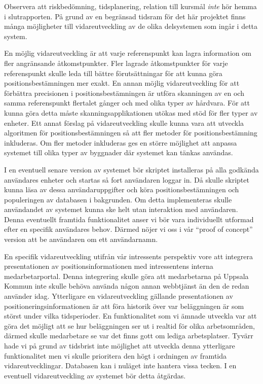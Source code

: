 \documentclass[a4paper,12pt]{article}
\begin{document}
Observera att risk\-be\-döm\-ning, tids\-planering, relation till kursmål \emph{inte} hör hemma i slutrapporten.
\fi
På grund av en begränsad tidsram för det här projektet finns många möjligheter till vidareutveckling av de olika delsystemen som ingår i detta system.

En möjlig vidareutveckling är att varje referenspunkt kan lagra information om fler angränsande åtkomstpunkter. Fler lagrade åtkomstpunkter för varje referenspunkt skulle leda till bättre förutsättningar för att kunna göra positionsbestämningen mer exakt. En annan möjlig vidareutveckling för att förbättra precisionen i positionsbestämningen är utföra skanningen av en och samma referenspunkt flertalet gånger och med olika typer av hårdvara. För att kunna göra detta måste skanningsapplikationen utökas med stöd för fler typer av enheter. Ett annat förslag på vidareutveckling skulle kunna vara att utveckla algoritmen för positionsbestämningen så att fler metoder för positionsbestämning inkluderas. Om fler metoder inkluderas ges en större möjlighet att anpassa systemet till olika typer av byggnader där systemet kan tänkas användas.

I en eventuell senare version av systemet bör skriptet installeras på alla godkända användares enheter och startas så fort användaren loggar in. Då skulle  skriptet kunna läsa av dessa användaruppgifter och köra positionsbestämningen och populeringen av databasen i bakgrunden. Om detta implementeras skulle användandet av systemet kunna ske helt utan interaktion med användaren. Denna eventuellt framtida funktionalitet anser vi bör vara individuellt utformad efter en specifik användares behov. Därmed nöjer vi oss i vår ``proof of concept'' version att be användaren om ett användarnamn.

En specifik vidareutveckling utifrån vår intressents perspektiv vore att integrera presentationen av positionsinformationen med intressentens interna medarbetarportal. Denna integrering skulle göra att medarbetarna på Uppsala Kommun inte skulle behöva använda någon annan webbtjänst än den de redan använder idag.
Ytterligare en vidareutveckling gällande presentationen av positioneringsinformationen är att föra historik över var beläggningen är som störst under vilka tidsperioder. En funktionalitet som vi ämnade utveckla var att göra det möjligt att se hur beläggningen ser ut i realtid för olika arbetsområden, därmed skulle medarbetare se var det finns gott om lediga arbetsplatser. Tyvärr hade vi på grund av tidsbrist inte möjlighet att utveckla denna ytterligare funktionalitet men vi skulle prioritera den högt i ordningen av framtida vidareutvecklingar.
Databasen kan i nuläget inte hantera vissa tecken. I en eventuell vidareutveckling av systemet bör detta åtgärdas.
\end{document}
